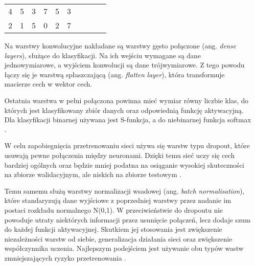 \begin{table}[h]
{\begin{tabular}{llllllllll}
\multicolumn{1}{|l|}{\cellcolor[HTML]{FFCB2F}4} & \multicolumn{1}{l|}{\cellcolor[HTML]{FFCB2F}5}  & \multicolumn{1}{l|}{\cellcolor[HTML]{FFCB2F}3} & \multicolumn{1}{l|}{\cellcolor[HTML]{32CB00}7} & \multicolumn{1}{l|}{\cellcolor[HTML]{32CB00}5} & \multicolumn{1}{l|}{\cellcolor[HTML]{32CB00}3} &  &                       &                                                 &                                                \\ \cline{1-6}
\multicolumn{1}{|l|}{\cellcolor[HTML]{FFCB2F}2} & \multicolumn{1}{l|}{\cellcolor[HTML]{FFCB2F}1}  & \multicolumn{1}{l|}{\cellcolor[HTML]{FFCB2F}5} & \multicolumn{1}{l|}{\cellcolor[HTML]{32CB00}0} & \multicolumn{1}{l|}{\cellcolor[HTML]{32CB00}2} & \multicolumn{1}{l|}{\cellcolor[HTML]{32CB00}7} &  &                       &                                                 &                                                \\ \cline{1-6}
\end{tabular}%
}
\label{tab:tabela_max_pooling}
\end{table}


Na warstwy konwolucyjne nakładane są warstwy gęsto połączone (ang. \textit{dense layers}), służące do klasyfikacji. Na  ich wejściu wymagane są dane jednowymiarowe, a wyjściem konwolucji są dane trójwymiarowe. Z tego powodu łączy się je warstwą spłaszczającą (ang. \textit{flatten layer}), która transformuje macierze cech w wektor cech.

Ostatnia warstwa w pełni połączona powinna mieć wymiar równy liczbie klas, do których jest klasyfikowany zbiór danych oraz odpowiednią funkcję aktywacyjną. Dla klasyfikacji binarnej używana jest S-funkcja, a do niebinarnej funkcja softmax \cite{Chollet2017DeepLW}.

W celu zapobiegnięcia przetrenowaniu sieci używa się warstw typu dropout, które usuwają pewne połączenia między neuronami. Dzięki temu sieć uczy się cech bardziej ogólnych oraz będzie mniej podatna na osiąganie wysokiej skuteczności na zbiorze walidacyjnym, ale niskich na zbiorze testowym \cite{Srivastava2014DropoutAS}.

Temu samemu służą warstwy normalizacji wsadowej (ang. \textit{batch normalisation}), które standaryzują dane wyjściowe z poprzedniej warstwy przez nadanie im postaci rozkładu normalnego N(0,1). W przeciwieństwie do dropoutu nie powoduje utraty niektórych informacji przez usunięcie połączeń, lecz dodaje szum do każdej funkcji aktywacyjnej. Skutkiem jej stosowania jest zwiększenie niezależności warstw od siebie, generalizacja działania sieci oraz zwiększenie współczynnika uczenia. Najlepszym podejściem jest używanie obu typów wastw zmniejszających ryzyko przetrenowania \cite{Ioffe2015BatchNA}.

